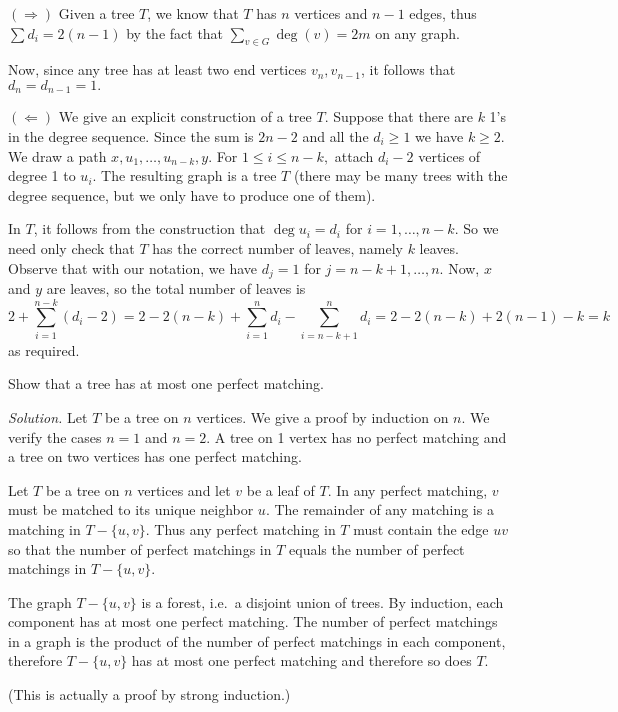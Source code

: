 \documentclass[10pt,reqno]{amsart}
\begin{document}
\begin{outline}[enumerate]
$(\Rightarrow)$ Given a tree $T$, we know that $T$ has $n$ vertices and $n-1$
edges, thus $\sum d_i = 2(n-1)$ by the fact that $\sum_{v\in G} \deg(v) = 2m$
on any graph.

Now, since any tree has at least two end vertices $v_n, v_{n-1}$, it follows
that $d_n = d_{n-1} = 1.$

$(\Leftarrow)$ We give an explicit construction of a tree $T$. Suppose that
there are $k$ 1's in the degree sequence. Since the sum is $2n-2$ and all the
$d_i \ge 1$ we have $k \ge 2.$ We draw a path $x, u_1, \dots, u_{n-k}, y.$ For
$1 \le i \le n-k,$ attach $d_i-2$ vertices of degree 1 to $u_i.$ The resulting
graph is a tree $T$ (there may be many trees with the degree sequence, but we
only have to produce one of them).

In $T$, it follows from the construction that $\deg u_i = d_i$ for $i =
1,\dots, n-k$. So we need only check that $T$ has the correct number of leaves,
namely $k$ leaves. Observe that with our notation, we have $d_j = 1$ for $j =
n-k+1, \dots, n.$ Now, $x$ and $y$ are leaves, so the total number of leaves is
\[2 + \sum_{i=1}^{n-k} (d_i-2) = 2-2(n-k)+\sum_{i=1}^n d_i - \sum_{i=n-k+1}^n
d_i = 2-2(n-k)+2(n-1)-k = k\] as required.

\medskip
\1 Show that a tree has at most one perfect matching.

\medskip
\noindent \emph{Solution.} Let $T$ be a tree on $n$ vertices. We give a proof
by induction on $n.$ We verify the cases $n=1$ and $n=2$. A tree on 1 vertex
has no perfect matching and a tree on two vertices has one perfect matching.

Let $T$ be a tree on $n$ vertices and let $v$ be a leaf of $T$. In any perfect
matching, $v$ must be matched to its unique neighbor $u$. The remainder of any
matching is a matching in $T-\{u,v\}$. Thus any perfect matching in $T$ must
contain the edge $uv$ so that the number of perfect matchings in $T$ equals the
number of perfect matchings in $T-\{u,v\}$.

The graph $T-\{u,v\}$ is a forest, i.e.~a disjoint union of trees. By
induction, each component has at most one perfect matching. The number of
perfect matchings in a graph is the product of the number of perfect matchings
in each component, therefore $T-\{u,v\}$ has at most one perfect matching and
therefore so does $T$.

(This is actually a proof by strong induction.)


\end{outline}
\end{document}
